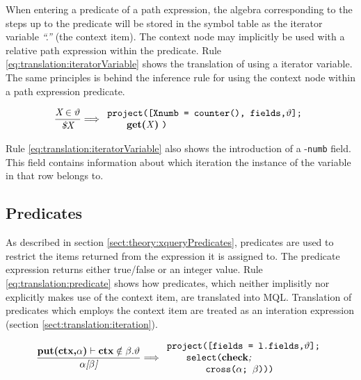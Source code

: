 When entering a predicate of a path expression, the algebra corresponding to
the steps up to the predicate will be stored in the symbol table as the
iterator variable \textit{``.''} (the context item). The context node may
implicitly be used with a relative path expression within the predicate. Rule
\ref{eq:translation:iteratorVariable} shows the translation of using a
iterator variable. The same principles is behind the inference rule for using
the context node within a path expression predicate.

\begin{equation}
\centering
\frac{\displaystyle \textit{X} \in \vartheta}{\displaystyle \textit{\$X}}
\Longrightarrow
\begin{array}{l}
	\mbox{\texttt{project([Xnumb = counter(), fields,}} \vartheta
	\mbox{\texttt{];}}
	\\ \qquad
	\mbox{\textbf{get(}\textit{X}\textbf{)} \texttt{)}}
\end{array}
\label{eq:translation:iteratorVariable}
\end{equation}


Rule \ref{eq:translation:iteratorVariable} also shows the introduction of a
-\verb!numb! field. This field contains information about which iteration the
instance of the variable in that row belongs to.

\subsection{Predicates}
As described in section \ref{sect:theory:xqueryPredicates}, predicates are used
to restrict the items returned from the expression it is assigned to. The
predicate expression returns either true/false or an integer value. Rule
\ref{eq:translation:predicate} shows how predicates, which neither implisitly
nor explicitly makes use of the context item, are translated into MQL.
Translation of predicates which employs the context item are treated as an
interation expression (section \ref{sect:translation:iteration}).

\begin{equation}
\centering
	\frac{\displaystyle \textbf{put(ctx,}\alpha\textbf{)}\vdash
	\textbf{ctx}\notin\beta . \vartheta}{\alpha \textit{[}\beta\textit{]}}
	\Longrightarrow 
	\begin{array}{l}
		\mbox{\texttt{project([fields = l.fields,}} \vartheta \mbox{\texttt{];}} 
		\\ \qquad \mbox{\texttt{select(}\textbf{check}\textit{;}} \\ \qquad \qquad
		\mbox{\texttt{cross(}} 
		\alpha \texttt{; }
		\beta \mbox{\texttt{)))}}
	\end{array}
\label{eq:translation:predicate}
\end{equation}


